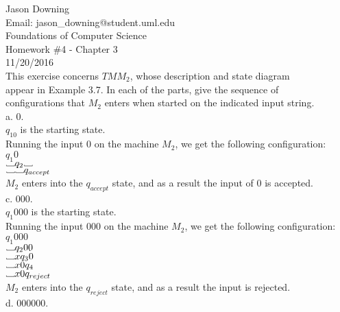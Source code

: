 \documentclass[12pt]{article}
\newcommand\Vtextvisiblespace[1][.8em]{%
	\mbox{\kern.07em\vrule height.3ex}%
	\vbox{\hrule width#1}%
	\hbox{\vrule height.3ex}}
\begin{document}
\noindent
Jason Downing \\
Email: jason\_downing@student.uml.edu \\
Foundations of Computer Science \\
Homework \#4 - Chapter 3 \\
11/20/2016 \\


 This exercise concerns $TM M_2$, whose description and state diagram \\
appear in Example 3.7. In each of the parts, give the sequence of \\
configurations that $M_2$ enters when started on the indicated input string. \\

a. 0. \\

$q_10$ is the starting state. \\
Running the input 0 on the machine $M_2$, we get the following configuration: \\

$q_1 0$ \\
$\Vtextvisiblespace q_2 \Vtextvisiblespace$ \\
$\Vtextvisiblespace  \Vtextvisiblespace q_{accept}$  \\
$M_2$ enters into the $q_{accept}$ state, and as a result the input of 0 is accepted. \\

c. 000. \\

$q_1 000$ is the starting state. \\
Running the input 000 on the machine $M_2$, we get the following configuration: \\

$q_1 000$ \\
$\Vtextvisiblespace q_2 00$ \\
$\Vtextvisiblespace x q_3 0$ \\
$\Vtextvisiblespace x0 q_4 $ \\
$\Vtextvisiblespace x0 q_{reject} $ \\
$M_2$ enters into the $q_{reject}$ state, and as a result the input is rejected. \\

\pagebreak
d. 000000. \\
\end{document}
